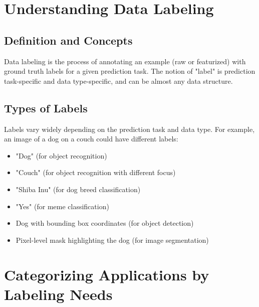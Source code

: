 \documentclass[12pt]{article}
\begin{document}
\section{Understanding Data Labeling}

\subsection{Definition and Concepts}
\begin{tcolorbox}[colback=yellow!5!white,colframe=yellow!75!black,title={Definition}]
Data labeling is the process of annotating an example (raw or featurized) with ground truth labels for a given prediction task. The notion of "label" is prediction task-specific and data type-specific, and can be almost any data structure.
\end{tcolorbox}

\subsection{Types of Labels}
Labels vary widely depending on the prediction task and data type. For example, an image of a dog on a couch could have different labels:

\begin{itemize}
    \item "Dog" (for object recognition)
    \item "Couch" (for object recognition with different focus)
    \item "Shiba Inu" (for dog breed classification)
    \item "Yes" (for meme classification)
    \item Dog with bounding box coordinates (for object detection)
    \item Pixel-level mask highlighting the dog (for image segmentation)
\end{itemize}

\section{Categorizing Applications by Labeling Needs}
\end{document}
